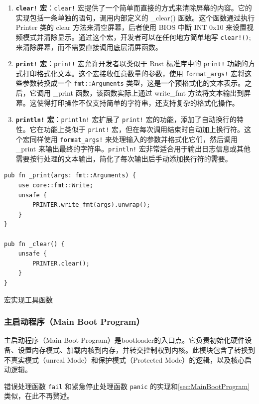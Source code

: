 \begin{enumerate}
    \item \textbf{\texttt{clear!} 宏}：\texttt{clear!} 宏提供了一个简单而直接的方式来清除屏幕的内容。它的实现包括一条单独的语句，调用内部定义的 \_clear() 函数。这个函数通过执行 Printer 类的 clear 方法来清空屏幕，后者使用 BIOS 中断 INT 0x10 来设置视频模式并清除显示。通过这个宏，开发者可以在任何地方简单地写 \texttt{clear!()}; 来清除屏幕，而不需要直接调用底层清屏函数。
    \item \textbf{\texttt{print!} 宏}：\texttt{print!} 宏允许开发者以类似于 Rust 标准库中的 \texttt{print!} 功能的方式打印格式化文本。这个宏接收任意数量的参数，使用 \texttt{format\_args!} 宏将这些参数转换成一个 \texttt{fmt::Arguments} 类型，这是一个预格式化的文本表示。之后，它调用 \_print 函数，该函数实际上通过 write\_fmt 方法将文本输出到屏幕。这使得打印操作不仅支持简单的字符串，还支持复杂的格式化操作。
    \item \textbf{\texttt{println!} 宏}：\texttt{println!} 宏扩展了 \texttt{print!} 宏的功能，添加了自动换行的特性。它在功能上类似于 \texttt{print!} 宏，但在每次调用结束时自动加上换行符。这个宏同样使用 \texttt{format\_args!} 来处理输入的参数并格式化它们，然后调用 \_print 来输出最终的字符串。\texttt{println!} 宏非常适合用于输出日志信息或其他需要按行处理的文本输出，简化了每次输出后手动添加换行符的需要。
\end{enumerate}

\begin{listing}[htbp]
    \begin{verbatim}
pub fn _print(args: fmt::Arguments) {
    use core::fmt::Write;
    unsafe {
        PRINTER.write_fmt(args).unwrap();
    }
}

pub fn _clear() {
    unsafe {
        PRINTER.clear();
    }
}
    \end{verbatim}
    \caption{宏实现工具函数}\label{lst:MacroImplementationUtils}
\end{listing}

\subsubsection{主启动程序（Main Boot Program）}

主启动程序（Main Boot Program）是bootloader的入口点。它负责初始化硬件设备、设置内存模式、加载内核到内存，并转交控制权到内核。此模块包含了转换到不真实模式（unreal Mode）和保护模式（Protected Mode）的逻辑，以及核心启动逻辑。

错误处理函数 \texttt{fail} 和紧急停止处理函数 \texttt{panic} 的实现和\cref{sec:MainBootProgram}类似，在此不再赘述。

